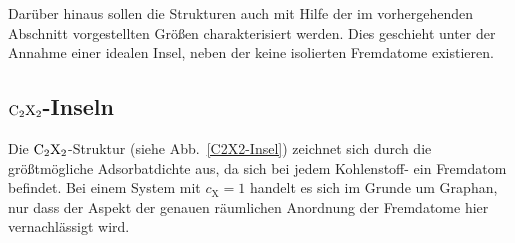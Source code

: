 \documentclass[a4paper, 10pt, twoside, openany]{book} %
\def \cX {c_\mathrm{X}}
\begin{document}
	Darüber hinaus sollen die Strukturen auch mit Hilfe der im vorhergehenden Abschnitt vorgestellten Größen charakterisiert werden. Dies geschieht unter der Annahme einer idealen Insel, neben der keine isolierten Fremdatome existieren.
	
	\subsection{$\rm C_2X_2$-Inseln}
	
	Die $\rm C_2X_2$-Struktur (siehe Abb.~\ref{C2X2-Insel}) zeichnet sich durch die größtmögliche Adsorbatdichte aus, da sich bei jedem Kohlenstoff- ein Fremdatom befindet. Bei einem System mit $\cX = 1$ handelt es sich im Grunde um Graphan, nur dass der Aspekt der genauen räumlichen Anordnung der Fremdatome hier vernachlässigt wird.
	
\end{document}
